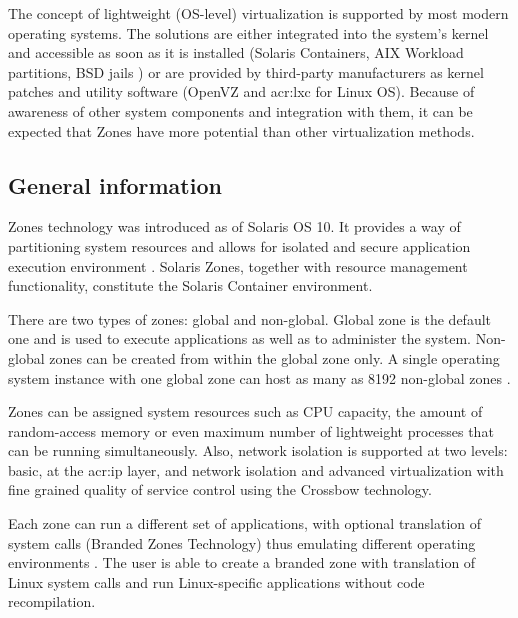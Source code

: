 \documentclass[11pt]{book}
\begin{document}

      The concept of lightweight (OS-level) virtualization is supported by most modern operating systems. The solutions
      are either integrated into the system's kernel and accessible as soon as it is installed (Solaris Containers, AIX
      Workload partitions, BSD jails \cite{kamp}) or are provided by third-party manufacturers as kernel patches and
      utility software (OpenVZ and \gls{acr:lxc} for Linux OS). Because of awareness of other system components and
      integration with them, it can be expected that Zones have more potential than other virtualization methods.


      \subsection{General information}
      \label{sub:}

        Zones technology was introduced as of Solaris OS 10. It provides a way of partitioning system resources and
        allows for isolated and secure application execution environment \cite{sag}. Solaris Zones, together with
        resource management functionality, constitute the Solaris Container environment.

        There are two types of zones: global and non-global. Global zone is the default one and is used to execute
        applications as well as to administer the system. Non-global zones can be created from within the global zone
        only. A single operating system instance with one global zone can host as many as 8192 non-global zones
        \cite{sag}.

        Zones can be assigned system resources such as CPU capacity, the amount of random-access memory or even maximum
        number of lightweight processes that can be running simultaneously. Also, network isolation is supported at two
        levels: basic, at the \gls{acr:ip} layer, and network isolation and advanced virtualization with fine grained quality of
        service control using the Crossbow technology.

        Each zone can run a different set of applications, with optional translation of system calls (Branded Zones
        Technology) thus emulating different operating environments \cite{sag}. The user is able to create a branded
        zone with translation of Linux system calls and run Linux-specific applications without code recompilation.
\end{document}

